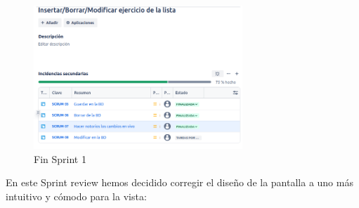 \begin{figure}[h!]
  \centering
  \includegraphics[width=0.7\textwidth]{fotos/SubListPost1.png}
  \caption{Fin Sprint 1}
  \label{fig:imagen}
\end{figure}

\clearpage

En este Sprint review hemos decidido corregir el diseño de la pantalla a uno más intuitivo y cómodo para la vista:

